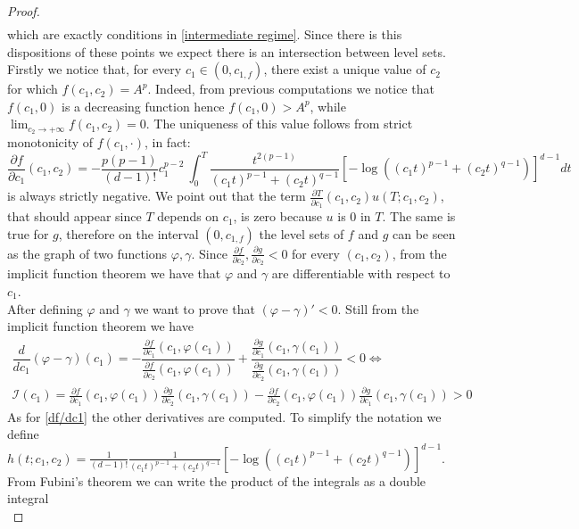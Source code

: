 \documentclass[corpo=11pt, stile=classica, tipotesi=custom,
greek, evenboxes, english]{toptesi}
\numberwithin{equation}{chapter}
\newcommand{\pfrac}[2]{\frac{\partial #1}{\partial #2}}
\begin{document}
\begin{proof}
\begin{align*}
\end{align*}
which are exactly conditions in \eqref{intermediate regime}.
Since there is this dispositions of these points we expect there is an intersection between level sets. Firstly we notice that, for every $c_1 \in (0,c_{1,f})$, there exist a unique value of $c_2$ for which $f(c_1,c_2) = A^p$. Indeed, from previous computations we notice that $f(c_1,0)$ is a decreasing function hence $f(c_1,0) > A^p$, while $\lim_{c_2 \rightarrow +\infty} f(c_1,c_2) = 0$. The uniqueness of this value follows from strict monotonicity of $f(c_1,\cdot)$, in fact:
\begin{equation}\label{df/dc1}
	\pfrac{f}{c_1}(c_1,c_2) = -\dfrac{p(p-1)}{(d-1)!}c_1^{p-2}\ \int_0^T \dfrac{t^{2(p-1)}}{(c_1t)^{p-1}+(c_2t)^{q-1}} \left[ -\log\left((c_1t)^{p-1} + (c_2t)^{q-1}\right) \right]^{d-1}dt
\end{equation}
is always strictly negative. We point out that the term $\frac{\partial T}{\partial c_1}(c_1,c_2)u(T;c_1,c_2)$, that should appear since $T$ depends on $c_1$, is zero because $u$ is 0 in $T$. The same is true for $g$, therefore on the interval $(0,c_{1,f})$ the level sets of $f$ and $g$ can be seen as the graph of two functions $\varphi, \gamma$. Since $\frac{\partial f}{\partial c_2}, \frac{\partial g}{\partial c_2} < 0$ for every $(c_1,c_2)$, from the implicit function theorem we have that $\varphi$ and  $\gamma$ are differentiable with respect to $c_1$.\\
After defining $\varphi$ and $\gamma$ we want to prove that $(\varphi-\gamma)' < 0$. Still from the implicit function theorem we have
\begin{equation*}
	\begin{split}
		\dfrac{d}{d c_1}(\varphi - \gamma)(c_1) = -\dfrac{\pfrac{f}{c_1}(c_1,\varphi(c_1))}{\pfrac{f}{c_2}(c_1,\varphi(c_1))}  + 
		\dfrac{\pfrac{g}{c_1}(c_1,\gamma(c_1))}{\pfrac{g}{c_2}(c_1,\gamma(c_1))} < 0 \iff \\
		\mathcal{I}(c_1) = \pfrac{f}{c_1}(c_1,\varphi(c_1)) \pfrac{g}{c_2}(c_1,\gamma(c_1)) - \pfrac{f}{c_2}(c_1,\varphi(c_1)) \pfrac{g}{c_1}(c_1,\gamma(c_1)) > 0
	\end{split}
\end{equation*}
As for \eqref{df/dc1} the other derivatives are computed. To simplify the notation we define $h(t;c_1,c_2) = \frac{1}{(d-1)!}\frac{1}{(c_1t)^{p-1}+(c_2t)^{q-1}}\left[ -\log\left((c_1t)^{p-1} + (c_2t)^{q-1}\right) \right]^{d-1}$. From Fubini's theorem we can write the product of the integrals as a double integral
\begin{equation*}

\end{equation*}
\end{proof}
\end{document}
